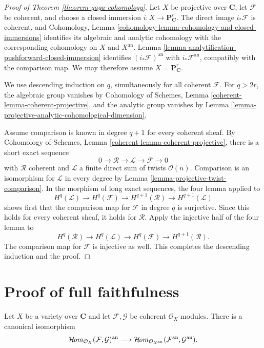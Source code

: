 \begin{proof}[Proof of Theorem \ref{theorem-gaga-cohomology}]
Let $X$ be projective over $\mathbf C$, let $\mathcal F$ be coherent, and
choose a closed immersion $i:X\to\mathbf P^r_{\mathbf C}$. The direct image
$i_*\mathcal F$ is coherent, and Cohomology, Lemma
\ref{cohomology-lemma-cohomology-and-closed-immersions} identifies its
algebraic and analytic cohomology with the corresponding cohomology on $X$
and $X^{\mathrm{an}}$. Lemma
\ref{lemma-analytification-pushforward-closed-immersion} identifies
$(i_*\mathcal F)^{\mathrm{an}}$ with $i_*\mathcal F^{\mathrm{an}}$, compatibly
with the comparison map. We may therefore assume
$X=\mathbf P^r_{\mathbf C}$.

We use descending induction on $q$, simultaneously for all coherent
$\mathcal F$. For $q>2r$, the algebraic group vanishes by Cohomology of
Schemes, Lemma \ref{coherent-lemma-coherent-projective}, and the analytic
group vanishes by Lemma
\ref{lemma-projective-analytic-cohomological-dimension}.

Assume comparison is known in degree $q+1$ for every coherent sheaf. By
Cohomology of Schemes, Lemma
\ref{coherent-lemma-coherent-projective}, there is a short exact sequence
$$
0\longrightarrow\mathcal R\longrightarrow
\mathcal L\longrightarrow\mathcal F\longrightarrow0
$$
with $\mathcal R$ coherent and $\mathcal L$ a finite direct sum of twists
$\mathcal O(n)$. Comparison is an isomorphism for $\mathcal L$ in every
degree by Lemma \ref{lemma-projective-twist-comparison}. In the morphism of
long exact sequences, the four lemma applied to
$$
H^q(\mathcal L)\longrightarrow H^q(\mathcal F)
\longrightarrow H^{q+1}(\mathcal R)\longrightarrow H^{q+1}(\mathcal L)
$$
shows first that the comparison map for $\mathcal F$ in degree $q$ is
surjective. Since this holds for every coherent sheaf, it holds for
$\mathcal R$. Apply the injective half of the four lemma to
$$
H^q(\mathcal R)\longrightarrow H^q(\mathcal L)
\longrightarrow H^q(\mathcal F)\longrightarrow H^{q+1}(\mathcal R).
$$
The comparison map for $\mathcal F$ is injective as well. This completes
the descending induction and the proof.
\end{proof}

\section{Proof of full faithfulness}
\label{section-proof-gaga-fully-faithful}

\begin{lemma}
\label{lemma-analytification-internal-hom}
Let $X$ be a variety over $\mathbf C$ and let $\mathcal F,\mathcal G$ be
coherent $\mathcal O_X$-modules. There is a canonical isomorphism
$$
\mathop{\mathcal{H}\!\mathit{om}}\nolimits_{\mathcal O_X}(\mathcal F,\mathcal G)^{\mathrm{an}}
\longrightarrow
\mathop{\mathcal{H}\!\mathit{om}}\nolimits_{\mathcal O_{X^{\mathrm{an}}}}
(\mathcal F^{\mathrm{an}},\mathcal G^{\mathrm{an}}).
$$
\end{lemma}

